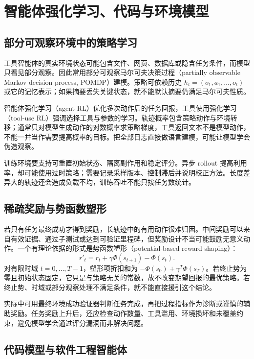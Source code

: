 \setcounter{chapter}{17} %
\chapter{智能体强化学习、代码与环境模型}
\label{ch:agentlearning}

\section{部分可观察环境中的策略学习}

工具智能体的真实环境状态可能包含文件、网页、数据库或隐含任务条件，而模型只看见部分观察。因此常用部分可观察马尔可夫决策过程（partially observable Markov decision process, POMDP）建模。策略可依赖历史 $h_t=(o_1,a_1,\ldots,o_t)$ 或它的记忆表示；如果摘要丢失关键状态，就不能默认摘要仍满足马尔可夫性质。

智能体强化学习（agent RL）优化多次动作后的任务回报，工具使用强化学习（tool-use RL）强调选择工具与参数的学习。轨迹概率包含策略动作与环境转移；通常只对模型生成动作的对数概率求策略梯度，工具返回文本不是模型动作，不能一并当作需要提高概率的目标。把全部日志直接做语言建模，可能让模型学会伪造观察。

训练环境要支持可重置初始状态、隔离副作用和稳定评分。异步 rollout 提高利用率，却可能使用过时策略；需要记录采样版本、控制滞后并说明校正方法。长度差异大的轨迹还会造成负载不均，训练吞吐不能只按任务数统计。

\section{稀疏奖励与势函数塑形}

若只有任务最终成功才得到奖励，长轨迹中的有用动作很难归因。中间奖励可以来自有效证据、通过子测试或达到可验证里程碑，但奖励设计不当可能鼓励无意义动作。一个有理论依据的形式是势函数塑形（potential-based reward shaping）：
\[
r'_t=r_t+\gamma\Phi(s_{t+1})-\Phi(s_t).
\]
对有限时域 $t=0,\ldots,T-1$，塑形项折扣和为 $-\Phi(s_0)+\gamma^T\Phi(s_T)$。若终止势为零且初始状态固定，它只是与策略无关的常数，故不改变期望回报的最优策略。若终止势、时域或部分观察处理不满足条件，就不能直接援引这个结论。

实际中可用最终环境成功验证器判断任务完成，再把过程指标作为诊断或谨慎的辅助奖励。任务奖励上升后，还应检查动作数量、工具滥用、环境损坏和未覆盖约束，避免模型学会通过评分漏洞而非解决问题。

\section{代码模型与软件工程智能体}

